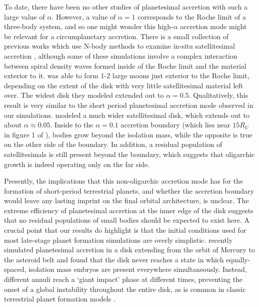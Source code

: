 \documentclass[twocolumn,linenumbers]{aastex63}
\begin{document}
To date, there have been no other studies of planetesimal accretion
with such a large value of $\alpha$. However, a value of $\alpha = 1$
corresponds to the Roche limit of a three-body system, and so one
might wonder this high-$\alpha$ accretion mode might be relevant for a
circumplanetary accretion. There is a small collection of previous works
which use N-body methods to examine in-situ satellitesimal accretion
\citep{ida97, richardson00, kokubo00b, ida20}, although some of these simulations involve a complex interaction between spiral 
density waves formed inside of the Roche limit and the material exterior to it. \citet{ida97} was able to form 1-2
large moons just exterior to the Roche limit, depending on the extent of the disk with very little satellitesimal material left over. 
The widest disk they modeled extended out to $\alpha = 0.5$. Qualitatively, this result is very similar to the short period 
planetesimal accretion mode observed in our simulations. \citet{ida20} modeled a much wider satellitesimal disk, which extends 
out to about $\alpha \approx 0.05$. Inside to the $\alpha = 0.1$ accretion boundary (which lies near $15 R_{U}$ in figure 1 of 
\citet{ida20}), bodies grow beyond the isolation mass, while the opposite is true on the other side of the boundary. In addition, a 
residual population of satellitesimals is still present beyond the boundary, which suggests that oligarchic growth is indeed 
operating only on the far side.

Presently, the implications that this non-oligarchic accretion mode has for the formation of short-period terrestrial planets, and 
whether the accretion boundary would leave any lasting imprint on the final orbital architecture, is unclear. The extreme efficiency of planetesimal accretion at the inner edge of the disk suggests that no residual populations of small bodies should be expected to exist here. A crucial point that our 
results do highlight is that the initial conditions used for most late-stage planet formation simulations are overly simplistic. 
\citet{clement20} recently simulated planetesimal accretion in a disk extending from the orbit of Mercury to the asteroid belt and 
found that the disk never reaches a state in which equally-spaced, isolation mass embryos are present everywhere 
simultaneously. Instead, different annuli reach a `giant impact' phase at different times, preventing the onset of a global instability 
throughout the entire disk, as is common in classic terrestrial planet formation models \citep{chambers01, raymond09}.
\end{document}
